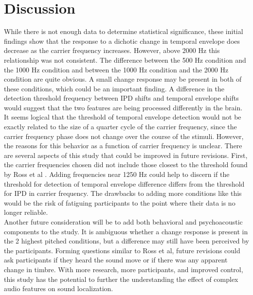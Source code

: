 \documentclass[12pt,journal,compsoc,twocolumn]{IEEEtran}
\begin{document}
\section{Discussion}
While there is not enough data to determine statistical significance, these initial findings show that the response to a dichotic change in temporal envelope does decrease as the carrier frequency increases. However, above 2000 Hz this relationship was not consistent. The difference between the 500 Hz condition and the 1000 Hz condition and between the 1000 Hz condition and the 2000 Hz condition are quite obvious.  A small change response may be present in both of these conditions, which could be an important finding. A difference in the detection threshold frequency between IPD shifts and temporal envelope shifts would suggest that the two features are being processed differently in the brain. \\

It seems logical that the threshold of temporal envelope detection would not be exactly related to the size of a quarter cycle of the carrier frequency, since the carrier frequency phase does not change over the course of the stimuli. However, the reasons for this behavior as a function of carrier frequency is unclear.  There are several aspects of this study that could be improved in future revisions. First, the carrier frequencies chosen did not include those closest to the threshold found by Ross et al \cite{Ross2007}. Adding frequencies near 1250 Hz could help to discern if the threshold for detection of temporal envelope difference differs from the threshold for IPD in carrier frequency. The drawbacks to adding more conditions like this would be the risk of fatiguing participants to the point where their data is no longer reliable.\\

Another future consideration will be to add both behavioral and psychoacoustic components to the study. It is ambiguous whether a change response is present in the 2 highest pitched conditions, but a difference may still have been perceived by the participants. Forming questions similar to Ross et al, future revisions could ask participants if they heard the sound move or if there was any apparent change in timbre. With more research, more participants, and improved control, this study has the potential to further the understanding the effect of complex audio features on sound localization.

	
\end{document}
